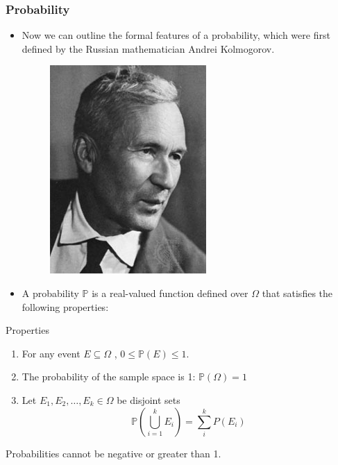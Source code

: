 \documentclass[handout]{beamer}
\begin{document}
\begin{frame}\frametitle{Probability}
\begin{scriptsize}
\begin{itemize}
\item Now we can outline the formal features of a probability, which were first defined by the Russian mathematician Andrei Kolmogorov.
\begin{figure}[h!]
	\centering
	\includegraphics[scale=0.15]{pics/kolmogorov.jpeg}
\end{figure}



 \item A probability $\mathbb{P}$ is a real-valued function defined over $\Omega$ that satisfies the following properties:
\end{itemize}

\begin{block}{Properties}
\begin{enumerate}
 \item For any event $E \subseteq \Omega$ , $0 \leq \mathbb{P}(E) \leq 1$.
 \item The probability of the sample space is 1: $\mathbb{P}(\Omega) =1$
 \item Let $E_{1},E_{2},\dots,E_{k} \in \Omega$ be disjoint sets 
 \begin{displaymath}
  \mathbb{P}(\bigcup_{i=1}^{k}E_{i}) = \sum_{i}^{k}P(E_{i})
 \end{displaymath}
\end{enumerate}
\end{block}

Probabilities cannot be negative or greater than 1.

\end{scriptsize} 

\end{frame}
\end{document}
